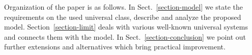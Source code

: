 Organization of the paper is as follows. In Sect.~\ref{section-model} we state the requirements on the used universal class, describe and analyze the proposed model. Section~\ref{section-limit} deals with various well-known universal systems and connects them with the model. In Sect.~\ref{section-conclusion} we point out further extensions and alternatives which bring practical improvement.
